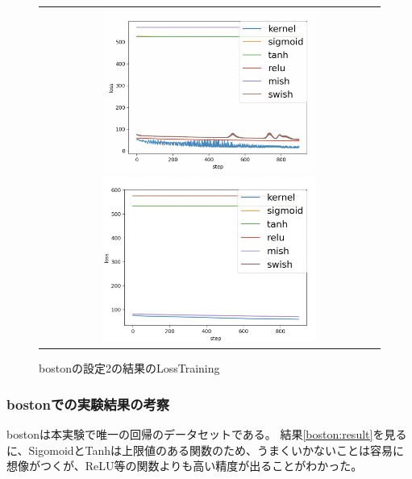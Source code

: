 \begin{figure}[hbtp]
    \begin{center}
        \begin{tabular}{c}
            \begin{minipage}{0.5\hsize}
                \includegraphics[clip, width=7cm]{asset/boston_0.00001_1000_3_005_sgd_non_kaiming_uniform.png}
                    \caption{bostonの設定1の結果のLossTraining}
                    \label{boston_1}
            \end{minipage}
            \hspace{10pt}
            \begin{minipage}{0.5\hsize}
                \includegraphics[clip, width=7cm]{asset/boston_0.00001_1000_3_005_sgd_non_xavier_uniform.png}
                    \caption{bostonの設定2の結果のLossTraining}
                    \label{boston_2}
            \end{minipage}
        \end{tabular}
    \end{center}
\end{figure}


\subsubsection{bostonでの実験結果の考察}
bostonは本実験で唯一の回帰のデータセットである。
結果\ref{boston:result}を見るに、SigomoidとTanhは上限値のある関数のため、うまくいかないことは容易に想像がつくが、ReLU等の関数よりも高い精度が出ることがわかった。





